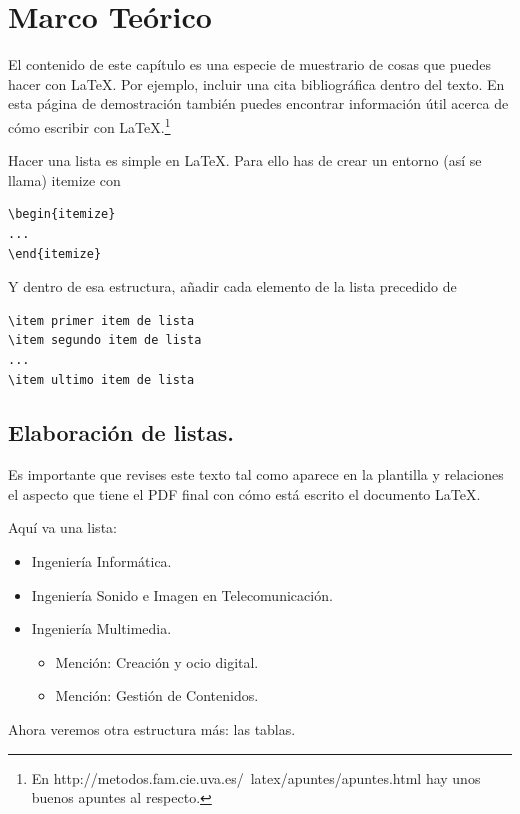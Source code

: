 \chapter{Marco Teórico}
\label{marcoteorico}

El contenido de este capítulo es una especie de muestrario de cosas que puedes hacer con \LaTeX.  Por ejemplo, incluir una cita bibliográfica   \cite{BOE_IM_UA} dentro del texto. En esta página de demostración también puedes encontrar información útil acerca de cómo escribir con  \LaTeX.\footnote{En http://metodos.fam.cie.uva.es/~latex/apuntes/apuntes.html hay unos buenos apuntes al respecto.}

Hacer una lista es simple en \LaTeX. Para ello has de crear un entorno (así se llama) itemize con
\begin{verbatim}
\begin{itemize}
...
\end{itemize}
\end{verbatim}
Y dentro de esa estructura, añadir cada elemento de la lista precedido de 
\begin{verbatim}
\item primer item de lista
\item segundo item de lista
...
\item ultimo item de lista
\end{verbatim}
\section{Elaboración de listas.}

Es importante que revises este texto tal como aparece en la plantilla y relaciones el aspecto que tiene el PDF final con cómo está escrito el documento \LaTeX.

Aquí va una lista:
\begin{itemize}
    \item Ingeniería Informática.
    \item Ingeniería Sonido e Imagen en Telecomunicación.
    \item Ingeniería Multimedia.
    \begin{itemize}
         \item Mención: Creación y ocio digital.
         \item Mención: Gestión de Contenidos.
    \end{itemize}
\end{itemize}

Ahora veremos otra estructura más: las tablas.

